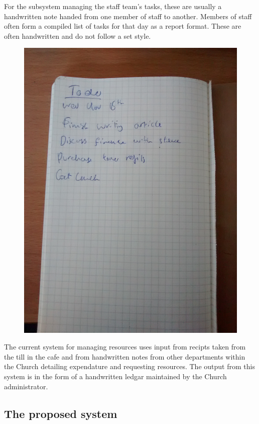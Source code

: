 For the subsystem managing the staff team's tasks, these are usually a handwritten note handed from one member of staff to another. Members of staff often form a compiled list of tasks for that day as a report format. These are often handwritten and do not follow a set style.

\begin{figure}[H]
	\includegraphics[width=\textwidth]{./Analysis/diagrams/todo.jpg}
\end{figure}

The current system for managing resources uses input from recipts taken from the till in the cafe and from handwritten notes from other departments within the Church detailing expendature and requesting resources. The output from this system is in the form of a handwritten ledgar maintained by the Church administrator.

\subsection{The proposed system}

